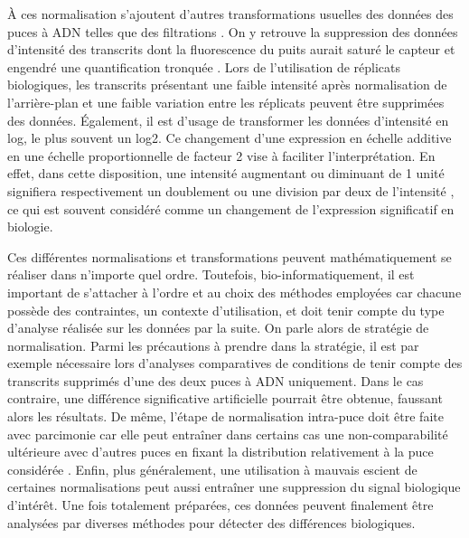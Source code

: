 À ces normalisation s'ajoutent d'autres transformations usuelles des données des puces à ADN telles que des filtrations \cite{Quackenbush2002Dec}. On y retrouve la suppression des données d'intensité des transcrits dont la fluorescence du puits aurait saturé le capteur et engendré une quantification tronquée \cite{Wilkes2007Apr}. Lors de l'utilisation de réplicats biologiques, les transcrits présentant une faible intensité après normalisation de l'arrière-plan et une faible variation entre les réplicats peuvent être supprimées des données. Également, il est d'usage de transformer les données d'intensité en log, le plus souvent un log2. Ce changement d'une expression en échelle additive en une échelle proportionnelle de facteur 2 vise à faciliter l'interprétation. En effet, dans cette disposition, une intensité augmentant ou diminuant de 1 unité signifiera respectivement un doublement ou une division par deux de l'intensité \cite{Smyth2003Dec}, ce qui est souvent considéré comme un changement de l'expression significatif en biologie. 

Ces différentes normalisations et transformations peuvent mathématiquement se réaliser dans n'importe quel ordre. Toutefois, bio-informatiquement, il est important de s'attacher à l'ordre et au choix des méthodes employées car chacune possède des contraintes, un contexte d'utilisation, et doit tenir compte du type d'analyse réalisée sur les données par la suite. On parle alors de stratégie de normalisation. Parmi les précautions à prendre dans la stratégie, il est par exemple nécessaire lors d'analyses comparatives de conditions de tenir compte des transcrits supprimés d'une des deux puces à ADN uniquement. Dans le cas contraire, une différence significative artificielle pourrait être obtenue, faussant alors les résultats. De même, l'étape de normalisation intra-puce doit être faite avec parcimonie car elle peut entraîner dans certains cas une non-comparabilité ultérieure avec d'autres puces en fixant la distribution relativement à la puce considérée \cite{Argyropoulos2006Apr}. Enfin, plus généralement, une utilisation à mauvais escient de certaines normalisations peut aussi entraîner une suppression du signal biologique d'intérêt. Une fois totalement préparées, ces données peuvent finalement être analysées par diverses méthodes pour détecter des différences biologiques.



